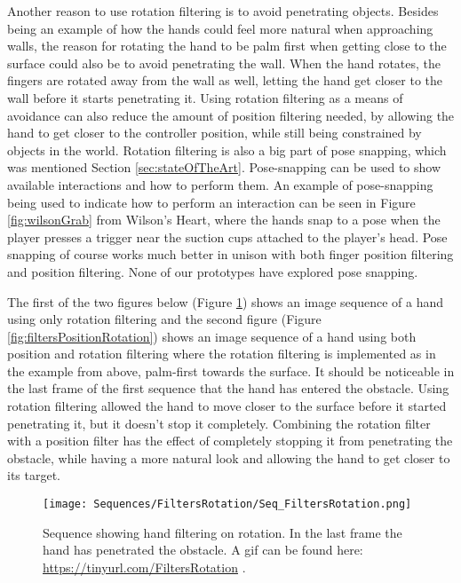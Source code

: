 Another reason to use rotation filtering is to avoid penetrating objects. Besides being an example of how the hands could feel more natural when approaching walls, the reason for rotating the hand to be palm first when getting close to the surface could also be to avoid penetrating the wall. When the hand rotates, the fingers are rotated away from the wall as well, letting the hand get closer to the wall before it starts penetrating it. Using rotation filtering as a means of avoidance can also reduce the amount of position filtering needed, by allowing the hand to get closer to the controller position, while still being constrained by objects in the world. Rotation filtering is also a big part of pose snapping, which was mentioned Section \ref{sec:stateOfTheArt}. Pose-snapping can be used to show available interactions and how to perform them. An example of pose-snapping being used to indicate how to perform an interaction can be seen in Figure \ref{fig:wilsonGrab} from Wilson's Heart, where the hands snap to a pose when the player presses a trigger near the suction cups attached to the player's head. Pose snapping of course works much better in unison with both finger position filtering and position filtering. None of our prototypes have explored pose snapping.

The first of the two figures below (Figure \ref{fig:filtersRotation}) shows an image sequence of a hand using only rotation filtering and the second figure (Figure \ref{fig:filtersPositionRotation}) shows an image sequence of a hand using both position and rotation filtering where the rotation filtering is implemented as in the example from above, palm-first towards the surface. It should be noticeable in the last frame of the first sequence that the hand has entered the obstacle. Using rotation filtering allowed the hand to move closer to the surface before it started penetrating it, but it doesn't stop it completely. Combining the rotation filter with a position filter has the effect of completely stopping it from penetrating the obstacle, while having a more natural look and allowing the hand to get closer to its target.

\begin{figure}[H]
\centering
\texttt{[image: Sequences/FiltersRotation/Seq\_FiltersRotation.png]}
\caption{Sequence showing hand filtering on rotation. In the last frame the hand has penetrated the obstacle. A gif can be found here: \url{https://tinyurl.com/FiltersRotation} .}
\label{fig:filtersRotation}
\end{figure}

